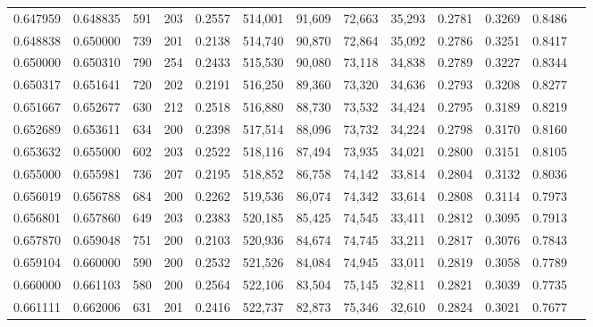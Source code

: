 \begin{tabular}{rrrrrrrrrrrrr}
0.647959 & 0.648835 &    591 &   203 &                                     0.2557 & 514,001 &  91,609 &  72,663 &  35,293 & 0.2781 & 0.3269 & 0.8486 \\
0.648838 & 0.650000 &    739 &   201 &                                     0.2138 & 514,740 &  90,870 &  72,864 &  35,092 & 0.2786 & 0.3251 & 0.8417 \\
0.650000 & 0.650310 &    790 &   254 &                                     0.2433 & 515,530 &  90,080 &  73,118 &  34,838 & 0.2789 & 0.3227 & 0.8344 \\
0.650317 & 0.651641 &    720 &   202 &                                     0.2191 & 516,250 &  89,360 &  73,320 &  34,636 & 0.2793 & 0.3208 & 0.8277 \\
0.651667 & 0.652677 &    630 &   212 &                                     0.2518 & 516,880 &  88,730 &  73,532 &  34,424 & 0.2795 & 0.3189 & 0.8219 \\
0.652689 & 0.653611 &    634 &   200 &                                     0.2398 & 517,514 &  88,096 &  73,732 &  34,224 & 0.2798 & 0.3170 & 0.8160 \\
0.653632 & 0.655000 &    602 &   203 &                                     0.2522 & 518,116 &  87,494 &  73,935 &  34,021 & 0.2800 & 0.3151 & 0.8105 \\
0.655000 & 0.655981 &    736 &   207 &                                     0.2195 & 518,852 &  86,758 &  74,142 &  33,814 & 0.2804 & 0.3132 & 0.8036 \\
0.656019 & 0.656788 &    684 &   200 &                                     0.2262 & 519,536 &  86,074 &  74,342 &  33,614 & 0.2808 & 0.3114 & 0.7973 \\
0.656801 & 0.657860 &    649 &   203 &                                     0.2383 & 520,185 &  85,425 &  74,545 &  33,411 & 0.2812 & 0.3095 & 0.7913 \\
0.657870 & 0.659048 &    751 &   200 &                                     0.2103 & 520,936 &  84,674 &  74,745 &  33,211 & 0.2817 & 0.3076 & 0.7843 \\
0.659104 & 0.660000 &    590 &   200 &                                     0.2532 & 521,526 &  84,084 &  74,945 &  33,011 & 0.2819 & 0.3058 & 0.7789 \\
0.660000 & 0.661103 &    580 &   200 &                                     0.2564 & 522,106 &  83,504 &  75,145 &  32,811 & 0.2821 & 0.3039 & 0.7735 \\
0.661111 & 0.662006 &    631 &   201 &                                     0.2416 & 522,737 &  82,873 &  75,346 &  32,610 & 0.2824 & 0.3021 & 0.7677 \\

\end{tabular}
